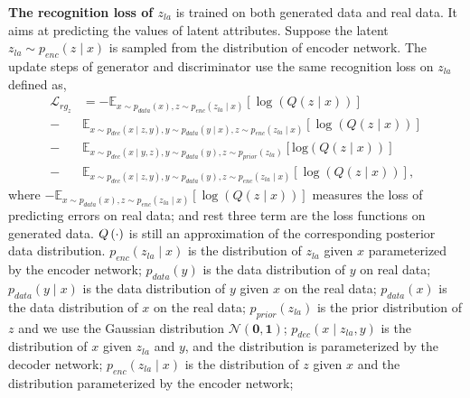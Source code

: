 \documentclass[10pt,letterpaper,twocolumn]{article}
\begin{document}
\noindent \textbf{The recognition loss of $z_{la}$} is trained on
both generated data and real data. It aims at predicting the values
of latent attributes. Suppose the latent $z_{la}\sim p_{enc}\left(z\mid x\right)$
is sampled from the distribution of encoder network. The update steps
of generator and discriminator use the same recognition loss on $z_{la}$
defined as, 
\begin{align}
\mathcal{L}_{rg_{z}} & =-\mathbb{E}_{x\sim p_{data}\left(x\right),z\sim p_{enc}\left(z_{la}\mid x\right)}\left[\log\left(Q\left(z\mid x\right)\right)\right]\label{eq:recognize_z}\\
- & \mathbb{E}_{x\sim p_{dec}\left(x\mid z,y\right),y\sim p_{data}\left(y\mid x\right),z\sim p_{enc}\left(z_{la}\mid x\right)}\left[\log\left(Q\left(z\mid x\right)\right)\right]\nonumber \\
- & \mathbb{E}_{x\sim p_{dec}\left(x\mid y,z\right),y\sim p_{data}\left(y\right),z\sim p_{prior}\left(z_{la}\right)}\left[\mathrm{log}\left(Q\left(z\mid x\right)\right)\right]\nonumber \\
- & \mathbb{E}_{x\sim p_{dec}\left(x\mid z,y\right),y\sim p_{data}\left(y\right),z\sim p_{enc}\left(z_{la}\mid x\right)}\left[\log\left(Q\left(z\mid x\right)\right)\right],\nonumber 
\end{align}
where $-\mathbb{E}_{x\sim p_{data}\left(x\right),z\sim p_{enc}\left(z_{la}\mid x\right)}\left[\log\left(Q\left(z\mid x\right)\right)\right]$
measures the loss of predicting errors on real data; and rest three
term are the loss functions on generated data.\textcolor{red}{{}
}$Q\left(\text{\ensuremath{\cdot}}\right)$ is still an approximation
of the corresponding posterior data distribution. $p_{enc}\left(z_{la}\mid x\right)$
is the distribution of $z_{la}$ given $x$ parameterized by the encoder
network; $p_{data}\left(y\right)$ is the data distribution of $y$
on real data; $p_{data}\left(y\mid x\right)$ is the data distribution
of $y$ given $x$ on the real data; $p_{data}\left(x\right)$ is
the data distribution of $x$ on the real data; $p_{prior}\left(z_{la}\right)$
is the prior distribution of $z$ and we use the Gaussian distribution
$\mathcal{N}\left(\mathbf{0},\mathbf{1}\right)$; $p_{dec}\left(x\mid z_{la},y\right)$
is the distribution of $x$ given $z_{la}$ and $y$, and the distribution
is parameterized by the decoder network; $p_{enc}\left(z_{la}\mid x\right)$
is the distribution of $z$ given $x$ and the distribution parameterized
by the encoder network;

\noindent \vspace{0.07in}
\end{document}
